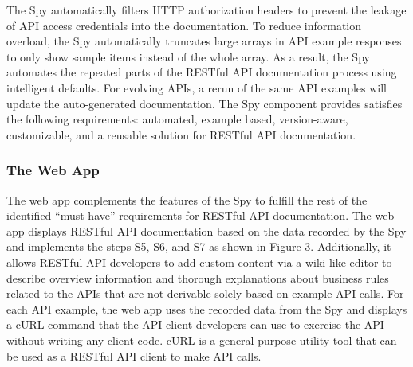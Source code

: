 \documentclass[11pt,oneside]{book}
\begin{document}
The Spy automatically filters HTTP authorization headers to prevent the leakage of API access credentials into the documentation. To reduce information overload, the Spy automatically truncates large arrays in API example responses to only show sample items instead of the whole array. As a result, the Spy automates the repeated parts of the RESTful API documentation process using intelligent defaults. For evolving APIs, a rerun of the same API examples will update the auto-generated documentation. The Spy component provides satisfies the following requirements: automated, example based, version-aware, customizable, and a reusable solution for RESTful API documentation.

\subsubsection{The Web App}
The web app complements the features of the Spy to fulfill the rest of the identified “must-have” requirements for RESTful API documentation. The web app displays RESTful API documentation based on the data recorded by the Spy and implements the steps S5, S6, and S7 as shown in Figure 3. Additionally, it allows RESTful API developers to add custom content via a wiki-like editor to describe overview information and thorough explanations about business rules related to the APIs that are not derivable solely based on example API calls.
For each API example, the web app uses the recorded data from the Spy and displays a cURL command that the API client developers can use to exercise the API without writing any client code. cURL is a general purpose utility tool that can be used as a RESTful API client to make API calls.
\end{document}
